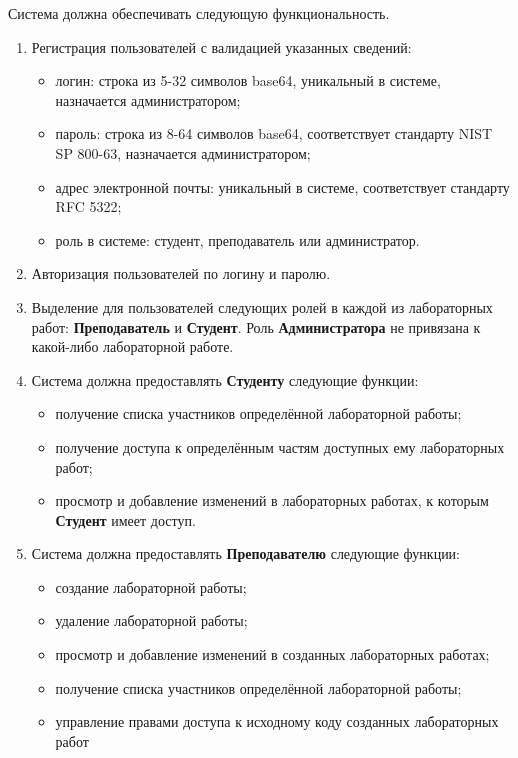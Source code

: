 \documentclass{bmstu}
\begin{document}
  Система должна обеспечивать следующую функциональность.
  \begin{enumerate}[label*=\arabic*.]
    \item Регистрация пользователей с валидацией указанных
      сведений:
      \begin{itemize}[label=---]
        \item логин: строка из 5-32 символов base64, уникальный в системе, назначается администратором;
        \item пароль: строка из 8-64 символов base64, соответствует стандарту NIST SP 800-63, назначается администратором;
        \item адрес электронной почты: уникальный в системе, соответствует стандарту RFC 5322;
        \item роль в системе: студент, преподаватель или администратор.
      \end{itemize}
    \item Авторизация пользователей по логину и паролю.
    \item Выделение для пользователей следующих ролей в каждой из лабораторных работ:
      \textbf{Преподаватель} и \textbf{Студент}.
      Роль \textbf{Администратора} не привязана к какой-либо лабораторной работе.
    \item Система должна предоставлять \textbf{Студенту} следующие функции:
    \begin{itemize}[label=---]
    	\item получение списка участников определённой лабораторной работы;
    	\item получение доступа к определённым частям доступных ему лабораторных работ;
    	\item просмотр и добавление изменений в лабораторных работах, к которым
    	  \textbf{Студент} имеет доступ.
    \end{itemize}
    \item Система должна предоставлять \textbf{Преподавателю} следующие
      функции:
    \begin{itemize}[label=---]
    	\item создание лабораторной работы;
    	\item удаление лабораторной работы;
    	\item просмотр и добавление изменений в созданных лабораторных работах;
    	\item получение списка участников определённой лабораторной работы;
    	\item управление правами доступа к исходному коду созданных лабораторных работ

\end{itemize}
\end{enumerate}
\end{document}
